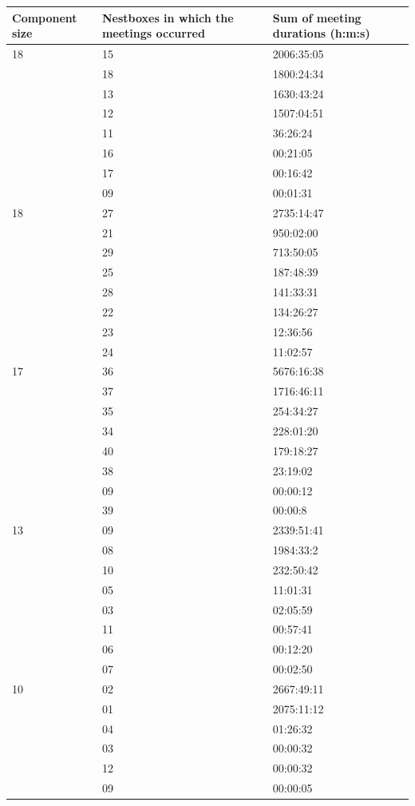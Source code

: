 \begin{table}
\begin{center}
\small
\renewcommand\arraystretch{1.1}
\begin{tabular}{lll}
\hline
\textbf{Component size} &	\textbf{Nestboxes in which the meetings occurred}	&	\textbf{Sum of meeting durations (h:m:s)} \\\hline
18	& 15	& 2006:35:05 \\
 	& 18	& 1800:24:34 \\
	& 13	& 1630:43:24 \\
	& 12	& 1507:04:51 \\
	& 11	& 36:26:24 \\
	& 16	& 00:21:05 \\
	& 17	& 00:16:42 \\
	& 09	& 00:01:31 \\\hline

18	& 27	& 2735:14:47 \\
	& 21	& 950:02:00 \\
	& 29	& 713:50:05 \\
	& 25	& 187:48:39 \\
	& 28	& 141:33:31 \\
	& 22	& 134:26:27 \\
	& 23 	& 12:36:56 \\
	& 24	& 11:02:57 \\\hline

17	& 36	& 5676:16:38 \\
	& 37	& 1716:46:11 \\
	& 35	& 254:34:27 \\
	& 34	& 228:01:20 \\
	& 40	& 179:18:27 \\
	& 38	& 23:19:02 \\
	& 09	& 00:00:12 \\
	& 39	& 00:00:8 \\\hline

13	& 09	& 2339:51:41 \\
	& 08 	& 1984:33:2 \\
	& 10	& 232:50:42 \\
	& 05	& 11:01:31 \\
	& 03 	& 02:05:59 \\
	& 11 	& 00:57:41 \\
	& 06	& 00:12:20 \\
	& 07	& 00:02:50 \\\hline
	
10	& 02	& 2667:49:11 \\
	& 01	& 2075:11:12 \\
	& 04	& 01:26:32 \\
	& 03	& 00:00:32 \\
	& 12	& 00:00:32 \\
	& 09	& 00:00:05 \\\hline


\end{tabular}
\end{center}
\end{table}
